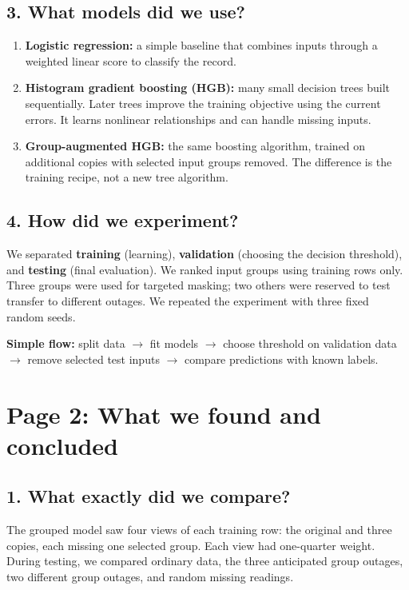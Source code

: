 \documentclass[11pt,a4paper]{article}
\begin{document}
\subsection*{3. What models did we use?}
\begin{enumerate}
\item \textbf{Logistic regression:} a simple baseline that combines inputs through a weighted linear score to classify the record.
\item \textbf{Histogram gradient boosting (HGB):} many small decision trees built sequentially. Later trees improve the training objective using the current errors. It learns nonlinear relationships and can handle missing inputs.
\item \textbf{Group-augmented HGB:} the same boosting algorithm, trained on additional copies with selected input groups removed. The difference is the training recipe, not a new tree algorithm.
\end{enumerate}

\subsection*{4. How did we experiment?}
We separated \textbf{training} (learning), \textbf{validation} (choosing the decision threshold), and \textbf{testing} (final evaluation). We ranked input groups using training rows only. Three groups were used for targeted masking; two others were reserved to test transfer to different outages. We repeated the experiment with three fixed random seeds.

\textbf{Simple flow:} split data $\rightarrow$ fit models $\rightarrow$ choose threshold on validation data $\rightarrow$ remove selected test inputs $\rightarrow$ compare predictions with known labels.

\newpage
\section*{Page 2: What we found and concluded}
\subsection*{1. What exactly did we compare?}
The grouped model saw four views of each training row: the original and three copies, each missing one selected group. Each view had one-quarter weight. During testing, we compared ordinary data, the three anticipated group outages, two different group outages, and random missing readings.
\end{document}
